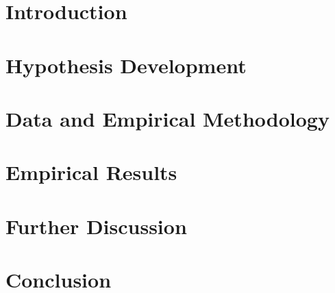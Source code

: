 \documentclass[a4paper, oneside,12pt]{article}
\begin{document}

\newpage


\newpage


\newpage



\newpage
\tableofcontents
\newpage
\listoftables
\clearpage



\newpage
{}
\fontsize{13pt}{18pt}\selectfont
\section{Introduction}\label{ch:Introduction}



\fontsize{13pt}{18pt}\selectfont
\section{Hypothesis Development}\label{ch:Hypothesis}


\fontsize{13pt}{18pt}\selectfont
\section{Data and Empirical Methodology}\label{ch:method}


\fontsize{13pt}{18pt}\selectfont
\section{Empirical Results}\label{ch:results}



\fontsize{13pt}{18pt}\selectfont
\section{Further Discussion}\label{ch:info}



\fontsize{13pt}{18pt}\selectfont
\section{Conclusion}\label{ch:conclusion}



\newpage
\printbibliography


\fontsize{13pt}{18pt}\selectfont
\newpage

\end{document}
